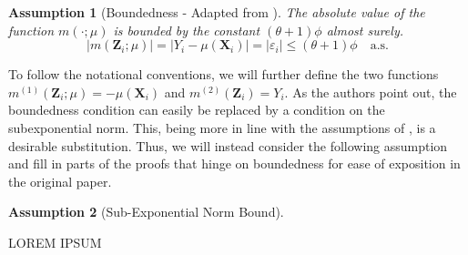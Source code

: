 \documentclass[letterpaper,10pt]{article}
\numberwithin{equation}{section}
\numberwithin{thm}{section}
\newtheorem{asm}{Assumption}
\newcommand{\1}{\mathbb{1}}
\begin{document}
\vspace{0.5cm}
\begin{asm}[Boundedness - Adapted from \citet{ritzwoller_uniform_2024}]
	The absolute value of the function $m(\cdot; \mu)$ is bounded by the constant $(\theta+1) \phi$ almost surely.
	\begin{equation}
		|m(\mathbf{Z}_i ; \mu)|
		= |Y_i - \mu(\mathbf{X}_i)|
		= |\varepsilon_i|
		\leq (\theta+1) \phi
		\quad \text{a.s.}
	\end{equation}
\end{asm}
To follow the notational conventions, we will further define the two functions $m^{(1)}(\mathbf{Z}_i; \mu) = - \mu(\mathbf{X}_i)$ and $m^{(2)}(\mathbf{Z}_i) = Y_i$.
As the authors point out, the boundedness condition can easily be replaced by a condition on the subexponential norm.
This, being more in line with the assumptions of \citet{demirkaya_optimal_2024}, is a desirable substitution.
Thus, we will instead consider the following assumption and fill in parts of the proofs that hinge on boundedness for ease of exposition in the original paper.

\vspace{0.5cm}
\begin{asm}[Sub-Exponential Norm Bound]

\end{asm}

{\color{red} LOREM IPSUM}



\end{document}
